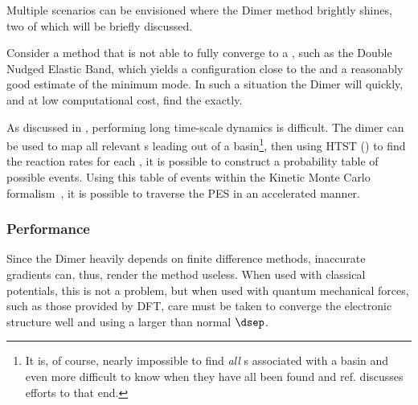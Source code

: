Multiple scenarios can be envisioned where the Dimer method brightly shines, two of which will be briefly discussed.

\item Consider a method that is not able to fully converge to a , such as the Double Nudged Elastic Band, which yields a configuration close to the  and a reasonably good estimate of the minimum mode.
In such a situation the Dimer will quickly, and at low computational cost, find the  exactly.
~\cite{dneb-2004}
\item As discussed in , performing long time-scale dynamics is difficult.
The dimer can be used to map all relevant s leading out of a basin\footnote{It is, of course, nearly impossible to find \emph{all} s associated with a basin and even more difficult to know when they have all been found and ref. \cite{dimer-sampling-2011} discusses efforts to that end.}, then using HTST () to find the reaction rates for each , it is possible to construct a probability table of possible events.
Using this table of events within the Kinetic Monte Carlo formalism~\citemiss, it is possible to traverse the PES in an accelerated manner.
~\cite{akmc-2001}
\een

\subsubsection{Performance}
Since the Dimer heavily depends on finite difference methods, inaccurate gradients can, thus, render the method useless.
When used with classical potentials, this is not a problem, but when used with quantum mechanical forces, such as those provided by DFT, care must be taken to converge the electronic structure well and using a larger than normal $\dsep$\citemiss.
